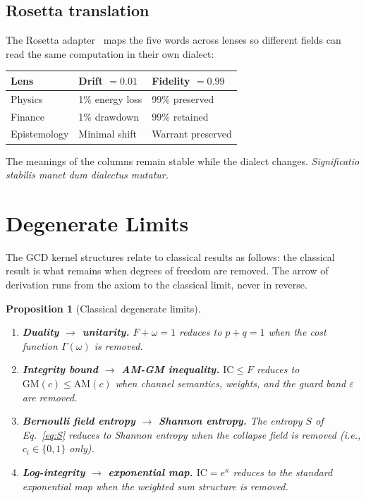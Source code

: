 \documentclass[
  aps,
  prd,
  twocolumn,
  superscriptaddress,
  nofootinbib,
  floatfix
]{revtex4-2}
\newtheorem{proposition}[theorem]{Proposition}
\newcommand{\Gam}{\Gamma}
\newcommand{\eps}{\varepsilon}
\newcommand{\IC}{\mathrm{IC}}
\begin{document}
\subsection{Rosetta translation}

The Rosetta adapter~\cite{paulus2025umcp} maps the five words across
lenses so different fields can read the same computation in their
own dialect:

\begin{center}
\small
\begin{tabular}{lll}
\toprule
Lens & Drift $= 0.01$ & Fidelity $= 0.99$ \\
\midrule
Physics & 1\% energy loss & 99\% preserved \\
Finance & 1\% drawdown & 99\% retained \\
Epistemology & Minimal shift & Warrant preserved \\
\bottomrule
\end{tabular}
\end{center}

The meanings of the columns remain stable while the dialect changes.
\emph{Significatio stabilis manet dum dialectus mutatur.}

\section{Degenerate Limits}\label{sec:degenerate}

The GCD kernel structures relate to classical results as follows:
the classical result is what remains when degrees of freedom are
removed.  The arrow of derivation runs from the axiom to the
classical limit, never in reverse.

\begin{proposition}[Classical degenerate limits]\label{prop:limits}
\begin{enumerate}[leftmargin=*,label=(\roman*)]
\item \textbf{Duality $\to$ unitarity.}
  $F + \omega = 1$ reduces to $p + q = 1$ when the cost function
  $\Gam(\omega)$ is removed.

\item \textbf{Integrity bound $\to$ AM-GM inequality.}
  $\IC \leq F$ reduces to $\mathrm{GM}(c) \leq \mathrm{AM}(c)$
  when channel semantics, weights, and the guard band $\eps$ are
  removed.

\item \textbf{Bernoulli field entropy $\to$ Shannon entropy.}
  The entropy $S$ of Eq.~\eqref{eq:S} reduces to Shannon entropy
  when the collapse field is removed (i.e., $c_i \in \{0, 1\}$
  only).

\item \textbf{Log-integrity $\to$ exponential map.}
  $\IC = e^\kappa$ reduces to the standard exponential map when the
  weighted sum structure is removed.
\end{enumerate}
\end{proposition}
\end{document}
